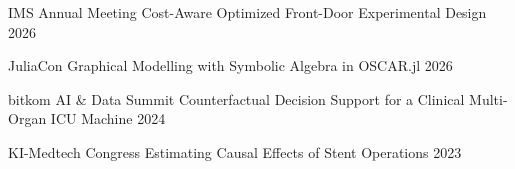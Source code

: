 
\begin{cvhonors}

  \cvhonor
    {IMS Annual Meeting}
    {Cost-Aware Optimized Front-Door Experimental Design}
    {}
    {2026}

  \cvhonor
    {JuliaCon}
    {Graphical Modelling with Symbolic Algebra in OSCAR.jl}
    {}
    {2026}

  \cvhonor
    {bitkom AI \& Data Summit}
    {Counterfactual Decision Support for a Clinical Multi-Organ ICU Machine}
    {}
    {2024}

  \cvhonor
    {KI-Medtech Congress}
    {Estimating Causal Effects of Stent Operations}
    {}
    {2023}

\end{cvhonors}
